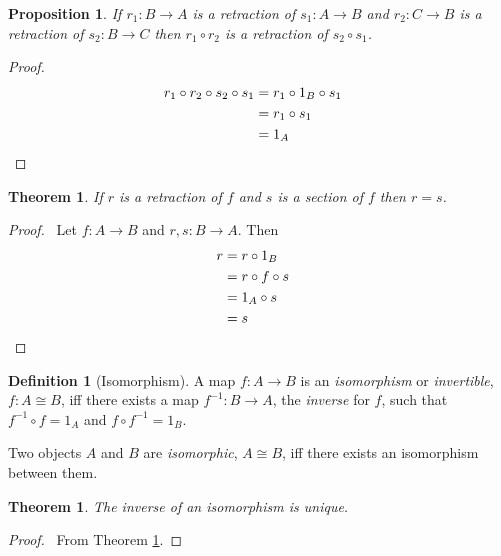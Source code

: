 \documentclass{article}
\let\qed\relax
\newtheorem{proposition}[axiom]{Proposition}
\newtheorem{thm}[axiom]{Theorem}
\theoremstyle{definition}
\newtheorem{definition}[axiom]{Definition}
\begin{document}
\begin{proposition}
    \label{proposition:retraction_comp}
    If $r_1 : B \rightarrow A$ is a retraction of $s_1 : A \rightarrow B$ and $r_2 : C \rightarrow B$
    is a retraction of $s_2 : B \rightarrow C$ then $r_1 \circ r_2$ is a retraction of $s_2 \circ s_1$.
\end{proposition}

\begin{proof}
    \pf
    \begin{align*}
        r_1 \circ r_2 \circ s_2 \circ s_1 & = r_1 \circ 1_B \circ s_1 \\
        & = r_1 \circ s_1 \\
        & = 1_A & \qed
    \end{align*}
\end{proof}

\begin{thm}
    \label{thm:inverse_unique}
    If $r$ is a retraction of $f$ and $s$ is a section of $f$ then $r = s$.
\end{thm}

\begin{proof}
    \pf\ Let $f : A \rightarrow B$ and $r, s : B \rightarrow A$. Then
    \begin{align*}
        r & = r \circ 1_B \\
        & = r \circ f \circ s \\
        & = 1_A \circ s \\
        & = s & \qed
    \end{align*}
\end{proof}

\begin{definition}[Isomorphism]
    A map $f : A \rightarrow B$ is an \emph{isomorphism} or \emph{invertible}, $f : A \cong B$, iff there
    exists a map $f^{-1} : B \rightarrow A$, the \emph{inverse} for $f$, such that $f^{-1} \circ f = 1_A$ and
    $f \circ f^{-1} = 1_B$.
    
    Two objects $A$ and $B$ are \emph{isomorphic}, $A \cong B$, iff there exists an isomorphism between them.
\end{definition}

\begin{thm}
    The inverse of an isomorphism is unique.
\end{thm}

\begin{proof}
    \pf\ From Theorem \ref{thm:inverse_unique}. \qed
\end{proof}
\end{document}
